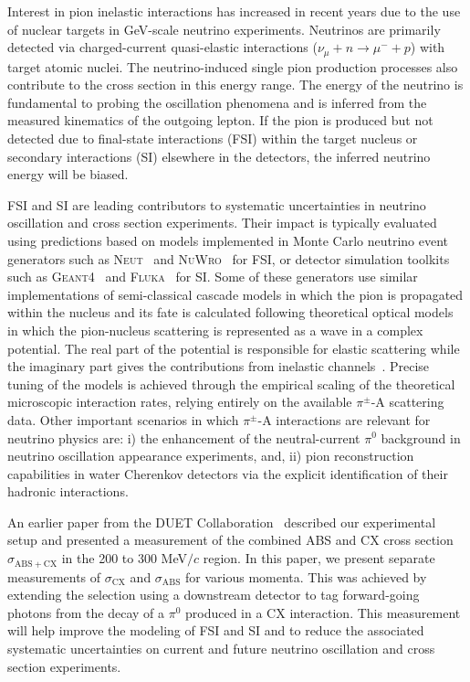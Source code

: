 Interest in pion inelastic interactions has increased in recent years due to the use of nuclear targets in GeV-scale neutrino experiments. Neutrinos are primarily detected via charged-current quasi-elastic interactions ($\nu_{\mu}+n\rightarrow \mu^{-} + p$) with target atomic nuclei. The neutrino-induced single pion production processes also contribute to the cross section in this energy range. The energy of the neutrino is fundamental to probing the oscillation phenomena and is inferred from the measured kinematics of the outgoing lepton.  If the pion is produced but not detected due to final-state interactions (FSI) within the target nucleus or secondary interactions (SI) elsewhere in the detectors, the inferred neutrino energy will be biased. 

FSI and SI are leading contributors to systematic uncertainties in neutrino oscillation and cross section experiments. Their impact is typically evaluated using predictions based on models implemented in Monte Carlo neutrino event generators such as \textsc{Neut}~\cite{NEUT} and \textsc{NuWro}~\cite{NuWro} for FSI, or detector simulation toolkits such as \textsc{Geant4}~\cite{bertini} and \textsc{Fluka}~\cite{fluka1,fluka2} for SI. Some of these generators use similar implementations of semi-classical cascade models in which the pion is propagated within the nucleus and its fate is calculated following theoretical optical models in which the pion-nucleus scattering is represented as a wave in a complex potential. The real part of the potential is responsible for elastic scattering while the imaginary part gives the contributions from inelastic channels~\cite{Oset,Salcedo}. Precise tuning of the models is achieved through the empirical scaling of the theoretical microscopic interaction rates, relying entirely on the available $\pi^{\pm}$-A scattering data. Other important scenarios in which $\pi^{\pm}$-A interactions are relevant for neutrino physics are: i) the enhancement of the neutral-current $\pi^{0}$ background in neutrino oscillation appearance experiments, and, ii) pion reconstruction capabilities in water Cherenkov detectors via the explicit identification of their hadronic interactions.

An earlier paper from the DUET Collaboration~\cite{duet} described our experimental setup and presented a measurement of the combined ABS and CX cross section $\sigma_{\mathrm{ABS}+\mathrm{CX}}$ in the 200 to 300 MeV$/c$ region. In this paper, we present separate measurements of $\sigma_{\mathrm{CX}}$ and $\sigma_{\mathrm{ABS}}$ for various momenta. This was achieved by extending the selection using a downstream detector to tag forward-going photons from the decay of a $\pi^0$ produced in a CX interaction. This measurement will help improve the modeling of FSI and SI and to reduce the associated systematic uncertainties on current and future neutrino oscillation and cross section experiments.